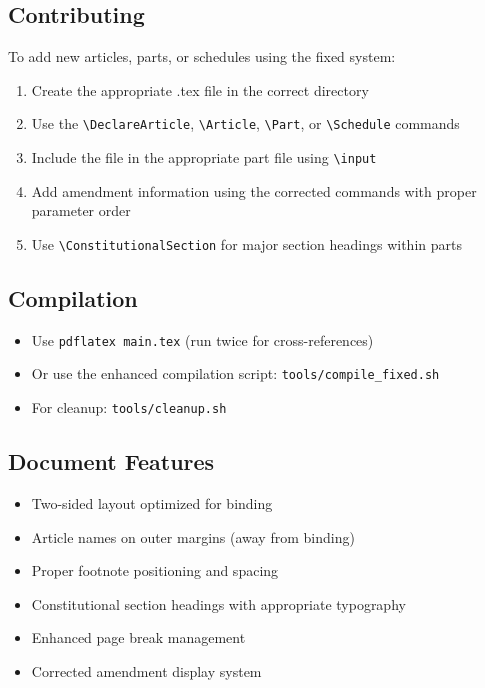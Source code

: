 \documentclass[a4paper,12pt,showamendments,twoside]{soi}
\begin{document}
    \subsection*{Contributing}
    To add new articles, parts, or schedules using the fixed system:
    \begin{enumerate}
    \item Create the appropriate .tex file in the correct directory
    \item Use the \texttt{\textbackslash{}DeclareArticle}, \texttt{\textbackslash{}Article}, \texttt{\textbackslash{}Part}, or \texttt{\textbackslash{}Schedule} commands
    \item Include the file in the appropriate part file using \texttt{\textbackslash{}input}
    \item Add amendment information using the corrected commands with proper parameter order
    \item Use \texttt{\textbackslash{}ConstitutionalSection} for major section headings within parts
    \end{enumerate}
    
    \subsection*{Compilation}
    \begin{itemize}
    \item Use \texttt{pdflatex main.tex} (run twice for cross-references)
    \item Or use the enhanced compilation script: \texttt{tools/compile\_fixed.sh}
    \item For cleanup: \texttt{tools/cleanup.sh}
    \end{itemize}
    
    \subsection*{Document Features}
    \begin{itemize}
    \item Two-sided layout optimized for binding
    \item Article names on outer margins (away from binding)
    \item Proper footnote positioning and spacing
    \item Constitutional section headings with appropriate typography
    \item Enhanced page break management
    \item Corrected amendment display system
    \end{itemize}
\fi
\end{document}
